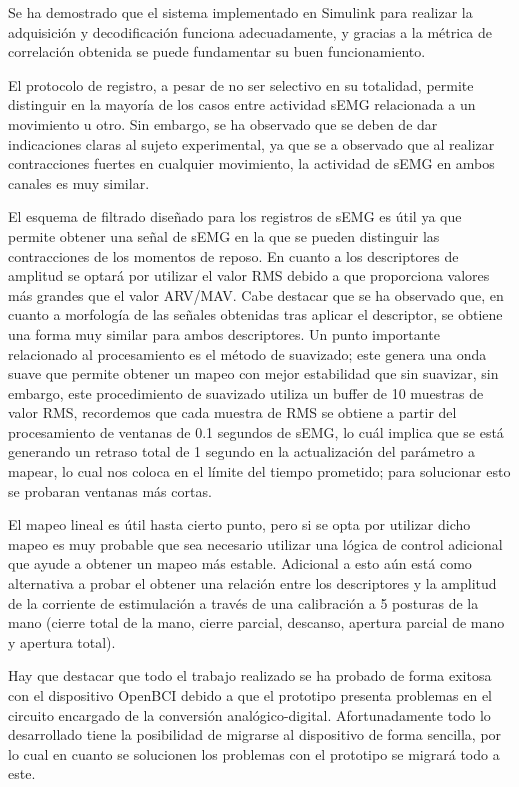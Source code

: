 Se ha demostrado que el sistema implementado en Simulink para realizar la adquisición y decodificación funciona adecuadamente, y gracias a la métrica de correlación obtenida se puede fundamentar su buen funcionamiento.

El protocolo de registro, a pesar de no ser selectivo en su totalidad, permite distinguir en la mayoría de los casos entre actividad sEMG relacionada a un movimiento u otro. Sin embargo, se ha observado que se deben de dar indicaciones claras al sujeto experimental, ya que se a observado que al realizar contracciones fuertes en cualquier movimiento, la actividad de sEMG en ambos canales es muy similar.

El esquema de filtrado diseñado para los registros de sEMG es útil ya que permite obtener una señal de sEMG en la que se pueden distinguir las contracciones de los momentos de reposo. En cuanto a los descriptores de amplitud se optará por utilizar el valor RMS debido a que proporciona valores más grandes que el valor ARV/MAV. Cabe destacar que se ha observado que, en cuanto a morfología de las señales obtenidas tras aplicar el descriptor, se obtiene una forma muy similar para ambos descriptores. Un punto importante relacionado al procesamiento es el método de suavizado; este genera una onda suave que permite obtener un mapeo con mejor estabilidad que sin suavizar, sin embargo, este procedimiento de suavizado utiliza un buffer de 10 muestras de valor RMS, recordemos que cada muestra de RMS se obtiene a partir del procesamiento de ventanas de 0.1 segundos de sEMG, lo cuál implica que se está generando un retraso total de 1 segundo en la actualización del parámetro a mapear, lo cual nos coloca en el límite del tiempo prometido; para solucionar esto se probaran ventanas más cortas.

El mapeo lineal es útil hasta cierto punto, pero si se opta por utilizar dicho mapeo es muy probable que sea necesario utilizar una lógica de control adicional que ayude a obtener un mapeo más estable. Adicional a esto aún está como alternativa a probar el obtener una relación entre los descriptores y la amplitud de la corriente de estimulación a través de una calibración a 5 posturas de la mano (cierre total de la mano, cierre parcial, descanso, apertura parcial de mano y apertura total).

Hay que destacar que todo el trabajo realizado se ha probado de forma exitosa con el dispositivo OpenBCI debido a que el prototipo presenta problemas en el circuito encargado de la conversión analógico-digital. Afortunadamente todo lo desarrollado tiene la posibilidad de migrarse al dispositivo de forma sencilla, por lo cual en cuanto se solucionen los problemas con el prototipo se migrará todo a este.
